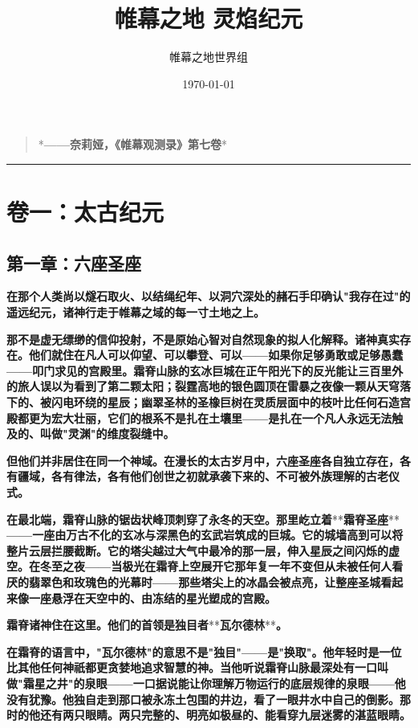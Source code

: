 \documentclass[12pt,a4paper,openany]{ctexbook}
\begin{document}
\title{帷幕之地 \cdot 灵焰纪元}
\author{帷幕之地世界组}
\date{\today}
\maketitle
\tableofcontents
\newpage

\begin{quote}
*\textbf{——奈莉娅，《帷幕观测录》第七卷}*

\end{quote}


\bigskip\hrule\bigskip


\chapter{卷一：太古纪元}


\section*{第一章：六座圣座}


\textbf{在那个人类尚以燧石取火、以结绳纪年、以洞穴深处的赭石手印确认"我存在过"的遥远纪元，诸神行走于帷幕之域的每一寸土地之上。}


\textbf{那不是虚无缥缈的信仰投射，不是原始心智对自然现象的拟人化解释。诸神真实存在。他们就住在凡人可以仰望、可以攀登、可以——如果你足够勇敢或足够愚蠢——叩门求见的宫殿里。霜脊山脉的玄冰巨城在正午阳光下的反光能让三百里外的旅人误以为看到了第二颗太阳；裂霆高地的银色圆顶在雷暴之夜像一颗从天穹落下的、被闪电环绕的星辰；幽翠圣林的圣橡巨树在灵质层面中的枝叶比任何石造宫殿都更为宏大壮丽，它们的根系不是扎在土壤里——是扎在一个凡人永远无法触及的、叫做"灵渊"的维度裂缝中。}


\textbf{但他们并非居住在同一个神域。在漫长的太古岁月中，六座圣座各自独立存在，各有疆域，各有律法，各有他们创世之初就承袭下来的、不可被外族理解的古老仪式。}


\textbf{在最北端，霜脊山脉的锯齿状峰顶刺穿了永冬的天空。那里屹立着}**\textbf{霜脊圣座}**\textbf{——一座由万古不化的玄冰与深黑色的玄武岩筑成的巨城。它的城墙高到可以将整片云层拦腰截断。它的塔尖越过大气中最冷的那一层，伸入星辰之间闪烁的虚空。在冬至之夜——当极光在霜脊上空展开它那年复一年不变但从未被任何人看厌的翡翠色和玫瑰色的光幕时——那些塔尖上的冰晶会被点亮，让整座圣城看起来像一座悬浮在天空中的、由冻结的星光塑成的宫殿。}


\textbf{霜脊诸神住在这里。他们的首领是独目者}**\textbf{瓦尔德林}**\textbf{。}


\textbf{在霜脊的语言中，"瓦尔德林"的意思不是"独目"——是"换取"。他年轻时是一位比其他任何神祇都更贪婪地追求智慧的神。当他听说霜脊山脉最深处有一口叫做"霜星之井"的泉眼——一口据说能让你理解万物运行的底层规律的泉眼——他没有犹豫。他独自走到那口被永冻土包围的井边，看了一眼井水中自己的倒影。那时的他还有两只眼睛。两只完整的、明亮如极昼的、能看穿九层迷雾的湛蓝眼睛。}
\end{document}
